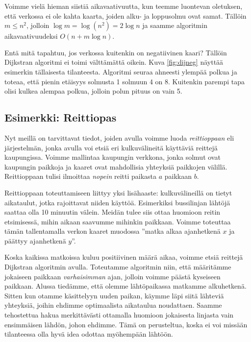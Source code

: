 Voimme vielä hieman siistiä aikavaativuutta, kun
teemme luontevan oletuksen,
että verkossa ei ole kahta kaarta, joiden alku- ja loppusolmu ovat samat.
Tällöin $m \le n^2$, jolloin $\log m = \log (n^2) = 2 \log n$
ja saamme algoritmin aikavaativuudeksi $O(n+m \log n)$.

Entä mitä tapahtuu, jos verkossa kuitenkin on negatiivinen kaari?
Tällöin Dijkstran algoritmi ei toimi välttämättä oikein.
Kuva \ref{fig:dijneg} näyttää esimerkin tällaisesta tilanteesta.
Algoritmi seuraa ahneesti ylempää polkua ja toteaa,
että pienin etäisyys solmusta 1 solmuun 4 on 8.
Kuitenkin parempi tapa olisi kulkea alempaa polkua,
jolloin polun pituus on vain 5.

\subsection{Esimerkki: Reittiopas}

Nyt meillä on tarvittavat tiedot,
joiden avulla voimme luoda \emph{reittioppaan}
eli järjestelmän, jonka avulla voi etsiä
eri kulkuvälineitä käyttäviä reittejä kaupungissa.
Voimme mallintaa kaupungin verkkona,
jonka solmut ovat kaupungin paikkoja ja kaaret
ovat mahdollisia yhteyksiä paikkojen välillä.
Reittioppaan tulisi ilmoittaa \emph{nopein} reitti
paikasta $a$ paikkaan $b$.

Reittioppaan toteuttamiseen liittyy yksi lisähaaste:
kulkuvälineillä on tietyt aikataulut,
jotka rajoittavat niiden käyttöä.
Esimerkiksi bussilinjan lähtöjä saattaa olla
10 minuutin välein.
Meidän tulee siis ottaa huomioon reitin etsimisessä,
mihin aikaan saavumme mihinkin paikkaan.
Voimme toteuttaa tämän tallentamalla verkon kaaret
muodossa ''matka alkaa ajanhetkenä $x$ ja
päättyy ajanhetkenä $y$''.

Koska kaikissa matkoissa kuluu positiivinen määrä aikaa,
voimme etsiä reittejä Dijkstran algoritmin avulla.
Toteutamme algoritmin niin,
että määritämme jokaiseen paikkaan \emph{varhaisimman}
ajan, jolloin voimme päästä kyseiseen paikkaan.
Alussa tiedämme, että olemme lähtöpaikassa
matkamme alkuhetkenä.
Sitten kun otamme käsittelyyn uuden paikan,
käymme läpi siitä lähteviä yhteyksiä,
joihin ehdimme optimaalista aikataulua noudattaen.
Saamme tehostettua hakua merkittävästi ottamalla
huomioon jokaisesta linjasta vain ensimmäisen lähdön,
johon ehdimme.
Tämä on perusteltua, koska ei voi missään tilanteessa
olla hyvä idea odottaa myöhempään lähtöön.

